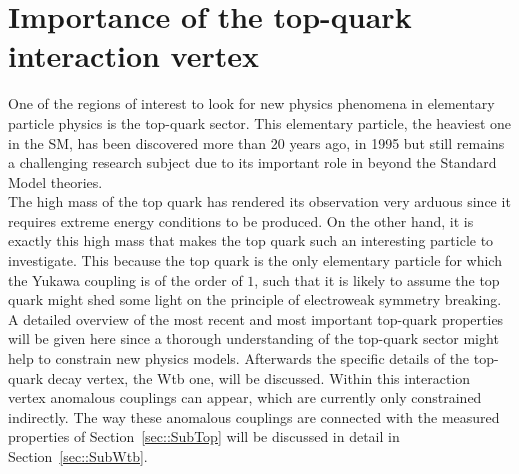 \section{Importance of the top-quark interaction vertex} \label{sec::TopQuarkPhysics}
One of the regions of interest to look for new physics phenomena in elementary particle physics is the top-quark sector. This elementary particle, the heaviest one in the SM, has been discovered more than 20 years ago, in 1995 but still remains a challenging research subject due to its important role in beyond the Standard Model theories. 
\\
The high mass of the top quark has rendered its observation very arduous since it requires extreme energy conditions to be produced. 
On the other hand, it is exactly this high mass that makes the top quark such an interesting particle to investigate.
This because the top quark is the only elementary particle for which the Yukawa coupling is of the order of $1$, such that it is likely to assume the top quark might shed some light on the principle of electroweak symmetry breaking.
\\
A detailed overview of the most recent and most important top-quark properties will be given here since a thorough understanding of the top-quark sector might help to constrain new physics models.
Afterwards the specific details of the top-quark decay vertex, the Wtb one, will be discussed. Within this interaction vertex anomalous couplings can appear, which are currently only constrained indirectly. The way these anomalous couplings are connected with the measured properties of Section~\ref{sec::SubTop} will be discussed in detail in Section~\ref{sec::SubWtb}.
%


